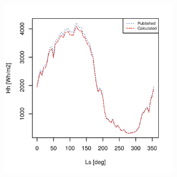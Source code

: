 \begin{figure}[h]
\captionsetup[subfigure]{justification=centering}
\centering
    \setlength{\subfigureWidth}{0.50\textwidth}
    \setlength{\graphicsHeight}{60mm}
    \hypersetup{hidelinks=true}%
    \begin{subfigure}[t]{\subfigureWidth}
        \centering
            \includegraphics[height=\graphicsHeight]{sections/appendix/insolation-calculation-verification/plots/hh-exp-calc-at-vl2.png}
            \label{fig:sub:comparative-global-insolation-at-vl2-horizontal-daily-variations}
    \end{subfigure}\hfill
    \begin{subfigure}[t]{\subfigureWidth}
        \centering

\end{subfigure}
\end{figure}
